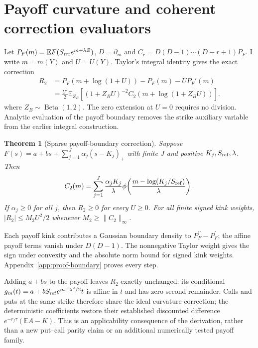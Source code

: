 \documentclass[11pt]{article}
\newtheorem{theorem}{Theorem}[section]
\newcommand{\E}{\mathbb E}
\begin{document}
\section{Payoff curvature and coherent correction evaluators}
\label{sec:oracles}

Let $P_F(m)=\E F(S_{\rm ref}e^{m+\lambda Z})$, $D=\partial_m$ and
$C_r=D(D-1)\cdots(D-r+1)P_F$. I write $m=m(Y)$ and $U=U(Y)$.
Taylor's integral identity gives the exact correction
\begin{equation}
 \begin{aligned}
 R_2&=P_F(m+\log(1+U))-P_F(m)-UP_F'(m)\\
 &=\frac{U^2}{2}\E_{Z_B}[(1+Z_BU)^{-2}C_2(m+\log(1+Z_BU))].
 \end{aligned}
 \label{eq:beta-identity}
\end{equation}
where $Z_B\sim\operatorname{Beta}(1,2)$. The zero extension at $U=0$
requires no division. Analytic evaluation of the payoff boundary removes
the strike auxiliary variable from the earlier integral construction.

\begin{theorem}[Sparse payoff-boundary correction]
\label{thm:boundary}
Suppose $F(s)=a+bs+\sum_{j=1}^J\alpha_j(s-K_j)_+$ with finite $J$ and
positive $K_j,S_{\rm ref},\lambda$. Then
\begin{equation}
 C_2(m)=\sum_{j=1}^J\frac{\alpha_jK_j}{\lambda}
 \phi\!\left(\frac{m-\log(K_j/S_{\rm ref})}{\lambda}\right).
 \label{eq:boundary-kernel}
\end{equation}
If $\alpha_j\geq0$ for all $j$, then $R_2\geq0$ for every $U\geq0$.
For all finite signed kink weights,
$|R_2|\leq M_2U^2/2$ whenever $M_2\geq\|C_2\|_\infty$.
\end{theorem}
Each payoff kink contributes a Gaussian boundary density to $P_F^{\prime\prime}-P_F^\prime$; the affine payoff terms vanish under $D(D-1)$. The nonnegative Taylor weight gives the sign under convexity and the absolute norm bound for signed kink weights. Appendix~\ref{app:proof-boundary} proves every step.

Adding $a+bs$ to the payoff leaves $R_2$ exactly unchanged: its
conditional $g_m(t)=a+bS_{\rm ref}e^{m+\lambda^2/2}t$ is affine in $t$
and has zero second remainder. Calls and puts at the same strike therefore
share the ideal curvature correction; the deterministic coefficients
restore their established discounted difference
$e^{-r_f\tau}(\E A-K)$. This is an applicability consequence of the
derivation, rather than a new put--call parity claim or an additional
numerically tested payoff family.
\end{document}
